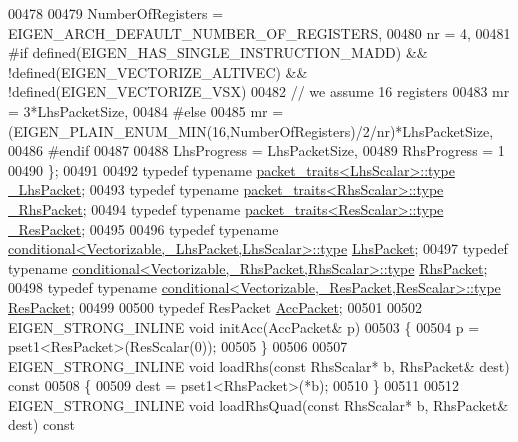 \begin{DoxyCode}
00478     
00479     NumberOfRegisters = EIGEN\_ARCH\_DEFAULT\_NUMBER\_OF\_REGISTERS,
00480     nr = 4,
00481 \textcolor{preprocessor}{#if defined(EIGEN\_HAS\_SINGLE\_INSTRUCTION\_MADD) && !defined(EIGEN\_VECTORIZE\_ALTIVEC) &&
       !defined(EIGEN\_VECTORIZE\_VSX)}
00482     \textcolor{comment}{// we assume 16 registers}
00483     mr = 3*LhsPacketSize,
00484 \textcolor{preprocessor}{#else}
00485     mr = (EIGEN\_PLAIN\_ENUM\_MIN(16,NumberOfRegisters)/2/nr)*LhsPacketSize,
00486 #endif
00487 
00488     LhsProgress = LhsPacketSize,
00489     RhsProgress = 1
00490   \};
00491 
00492   \textcolor{keyword}{typedef} \textcolor{keyword}{typename} \hyperlink{group___sparse_core___module}{packet\_traits<LhsScalar>::type}  
      \hyperlink{group___sparse_core___module}{\_LhsPacket};
00493   \textcolor{keyword}{typedef} \textcolor{keyword}{typename} \hyperlink{group___sparse_core___module}{packet\_traits<RhsScalar>::type}  
      \hyperlink{group___sparse_core___module}{\_RhsPacket};
00494   \textcolor{keyword}{typedef} \textcolor{keyword}{typename} \hyperlink{group___sparse_core___module}{packet\_traits<ResScalar>::type}  
      \hyperlink{group___sparse_core___module}{\_ResPacket};
00495 
00496   \textcolor{keyword}{typedef} \textcolor{keyword}{typename} \hyperlink{class_eigen_1_1internal_1_1_tensor_lazy_evaluator_writable}{conditional<Vectorizable,\_LhsPacket,LhsScalar>::type}
       \hyperlink{class_eigen_1_1internal_1_1_tensor_lazy_evaluator_writable}{LhsPacket};
00497   \textcolor{keyword}{typedef} \textcolor{keyword}{typename} \hyperlink{class_eigen_1_1internal_1_1_tensor_lazy_evaluator_writable}{conditional<Vectorizable,\_RhsPacket,RhsScalar>::type}
       \hyperlink{class_eigen_1_1internal_1_1_tensor_lazy_evaluator_writable}{RhsPacket};
00498   \textcolor{keyword}{typedef} \textcolor{keyword}{typename} \hyperlink{class_eigen_1_1internal_1_1_tensor_lazy_evaluator_writable}{conditional<Vectorizable,\_ResPacket,ResScalar>::type}
       \hyperlink{class_eigen_1_1internal_1_1_tensor_lazy_evaluator_writable}{ResPacket};
00499 
00500   \textcolor{keyword}{typedef} ResPacket \hyperlink{class_eigen_1_1internal_1_1_tensor_lazy_evaluator_writable}{AccPacket};
00501 
00502   EIGEN\_STRONG\_INLINE \textcolor{keywordtype}{void} initAcc(AccPacket& p)
00503   \{
00504     p = pset1<ResPacket>(ResScalar(0));
00505   \}
00506 
00507   EIGEN\_STRONG\_INLINE \textcolor{keywordtype}{void} loadRhs(\textcolor{keyword}{const} RhsScalar* b, RhsPacket& dest)\textcolor{keyword}{ const}
00508 \textcolor{keyword}{  }\{
00509     dest = pset1<RhsPacket>(*b);
00510   \}
00511   
00512   EIGEN\_STRONG\_INLINE \textcolor{keywordtype}{void} loadRhsQuad(\textcolor{keyword}{const} RhsScalar* b, RhsPacket& dest)\textcolor{keyword}{ const}

\end{DoxyCode}
